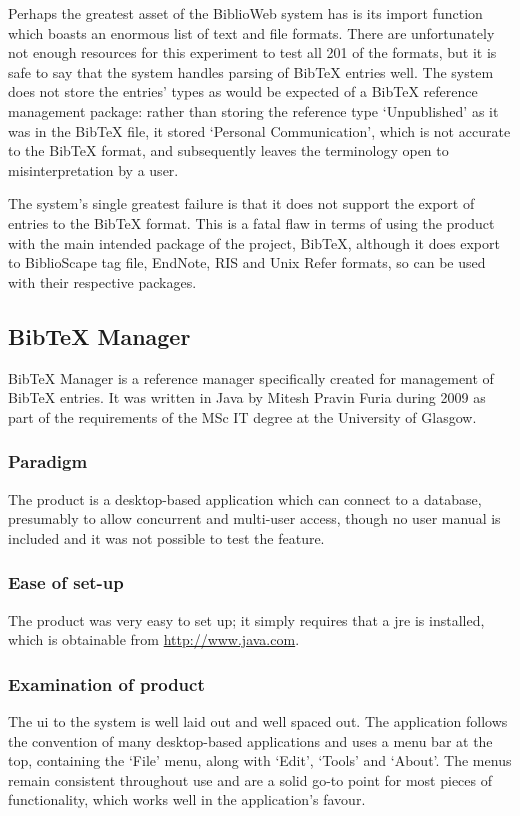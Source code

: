 \documentclass{l4proj}
\newcommand{\BibTeX}{B{\sc ib}\TeX}
\newcommand{\bibtex}{\BibTeX}
\begin{document}
Perhaps the greatest asset of the BiblioWeb system has is its import function which boasts an enormous list of text and file formats.  There are unfortunately not enough resources for this experiment to test all 201 of the formats, but it is safe to say that the system handles parsing of \bibtex{} entries well.  The system does not store the entries' types as would be expected of a \bibtex{} reference management package: rather than storing the reference type `Unpublished' as it was in the \bibtex{} file, it stored `Personal Communication', which is not accurate to the \bibtex{} format, and subsequently leaves the terminology open to misinterpretation by a user.

The system's single greatest failure is that it does not support the export of entries to the \bibtex{} format.  This is a fatal flaw in terms of using the product with the main intended package of the project, \bibtex, although it does export to BiblioScape tag file, EndNote, RIS and Unix Refer formats, so can be used with their respective packages.


\subsection{\bibtex{} Manager}
\bibtex{} Manager is a reference manager specifically created for management of \bibtex{} entries.  It was written in Java by Mitesh Pravin Furia during 2009 as part of the requirements of the MSc IT degree at the University of Glasgow.

\subsubsection{Paradigm}
The product is a desktop-based application which can connect to a database, presumably to allow concurrent and multi-user access, though no user manual is included and it was not possible to test the feature.

\subsubsection{Ease of set-up}
The product was very easy to set up; it simply requires that a \gls{jre} is installed, which is obtainable from \url{http://www.java.com}.

\subsubsection{Examination of product}
The \gls{ui} to the system is well laid out and well spaced out. The application follows the convention of many desktop-based applications and uses a menu bar at the top, containing the `File' menu, along with `Edit', `Tools' and `About'.  The menus remain consistent throughout use and are a solid go-to point for most pieces of functionality, which works well in the application's favour.
\end{document}

